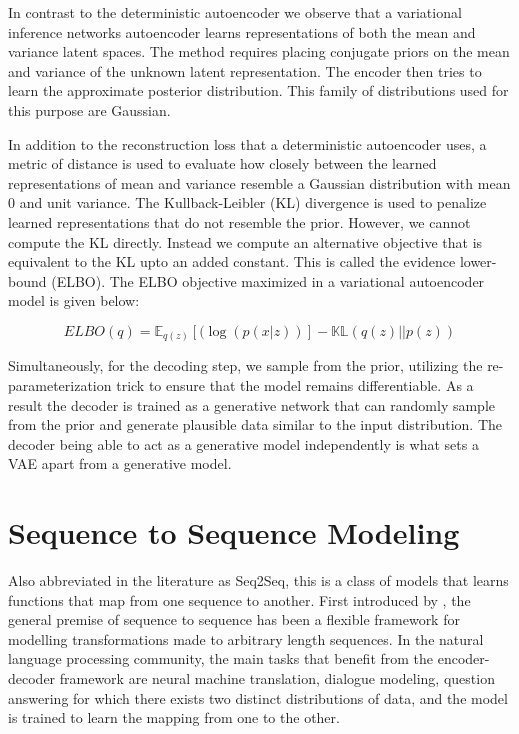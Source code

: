 In contrast to the deterministic autoencoder we observe that a variational inference networks autoencoder learns representations of both the mean and variance latent spaces. The method requires placing conjugate priors on the mean and variance of the unknown latent representation. The encoder then tries to learn the approximate posterior distribution. This family of distributions used for this purpose are Gaussian.

In addition to the reconstruction loss that a deterministic autoencoder uses, a metric of distance is used to evaluate how closely between the learned representations of mean and variance resemble a Gaussian distribution with mean 0 and unit variance. The Kullback-Leibler (KL) divergence \citep{kullback1951information} is used to penalize learned representations that do not resemble the prior. However, we cannot compute the KL directly. Instead we compute an alternative objective that is equivalent to the KL upto an added constant. This is called the evidence lower-bound (ELBO). The ELBO objective maximized in a variational autoencoder model is given below:

\begin{equation}
	ELBO(q) = \mathbb{E}_{q(z)} [(\log(p(x|z))] - \mathbb{KL}(q(z)||p(z))
\end{equation}

Simultaneously, for the decoding step, we sample from the prior, utilizing the re-parameterization trick to ensure that the model remains differentiable. As a result the decoder is trained as a generative network that can randomly sample from the prior and generate plausible data similar to the input distribution. The decoder being able to act as a generative model independently is what sets a VAE apart from a generative model.

\section{Sequence to Sequence Modeling}

Also abbreviated in the literature as Seq2Seq, this is a class of models that learns functions that map from one sequence to another. First introduced by \cite{sutskever2014sequence}, the general premise of sequence to sequence has been a flexible framework for modelling transformations made to arbitrary length sequences. In the natural language processing community, the main tasks that benefit from the encoder-decoder framework are neural machine translation, dialogue modeling, question answering for which there exists two distinct distributions of data, and the model is trained to learn the mapping from one to the other.

